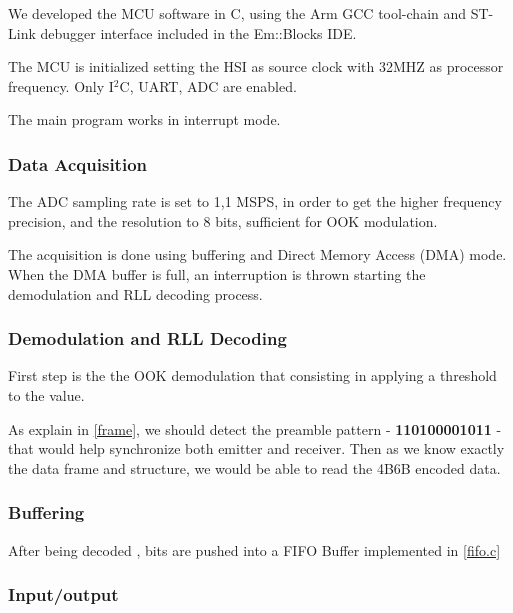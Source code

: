We developed the MCU software in C, using the Arm GCC tool-chain and ST-Link debugger interface included in the Em::Blocks \citep{emblocks} IDE.

The MCU is initialized setting the HSI as source clock with 32MHZ as processor frequency. Only I$^2$C, UART, ADC are enabled.

The main program works in interrupt mode. 

\subsubsection{Data Acquisition}

The ADC sampling rate is set to 1,1 MSPS, in order to get the higher frequency precision, and the resolution to 8 bits, sufficient for OOK modulation.

The acquisition is done using buffering and Direct Memory Access (DMA) mode. 
When the DMA buffer is full, an interruption is thrown starting the demodulation and RLL decoding process.

\subsubsection{Demodulation and RLL Decoding}

First step is the the OOK demodulation that consisting in applying a threshold to the value.



As explain in \ref{frame}, we should detect the preamble pattern - \textbf{110100001011} - that would help synchronize both emitter and receiver.
Then as we know exactly the data frame and structure, we would be able to read the 4B6B encoded data.


\subsubsection{Buffering}


After being decoded , bits are pushed into a FIFO Buffer implemented in \ref{fifo.c}



\subsubsection{Input/output}
 
